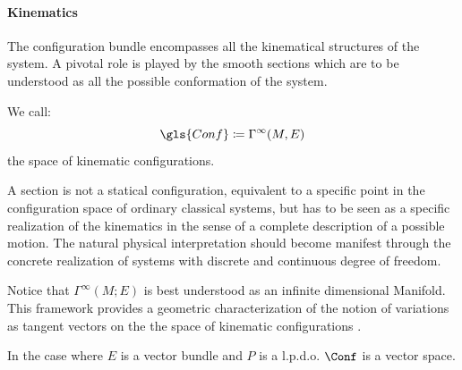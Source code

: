 \documentclass[Main]{subfiles}
\begin{document}
	
	\paragraph{Kinematics}
	The configuration bundle encompasses all the kinematical structures of the system.
	 A pivotal role is played by the smooth sections  which are to be understood as all the possible conformation of the system.

	\begin{definition}
		We call:
		\begin{displaymath}
			\gls{Conf} \coloneqq \Gamma^\infty(M,E)
		\end{displaymath}
		the space of kinematic configurations.
	\end{definition}

	A section is not a statical configuration, equivalent to a specific point in the configuration space of ordinary classical systems, but has to be seen as a specific realization of the kinematics in the sense of  a complete description of a possible motion. %
	The natural physical interpretation should become manifest through the concrete realization of systems with discrete and continuous degree of freedom.
	
		\begin{remark}
	Notice that $\Gamma^\infty(M;E)$ is best understood as an infinite dimensional Manifold. 
	\\
	This framework provides a geometric characterization of the notion of variations as tangent vectors on the the space of kinematic configurations .\cite{Forger2005}
	
	In the case where $E$ is a vector bundle and $P$ is a l.p.d.o. $\Conf$ is a vector space.
		\end{remark}
	
\end{document}
